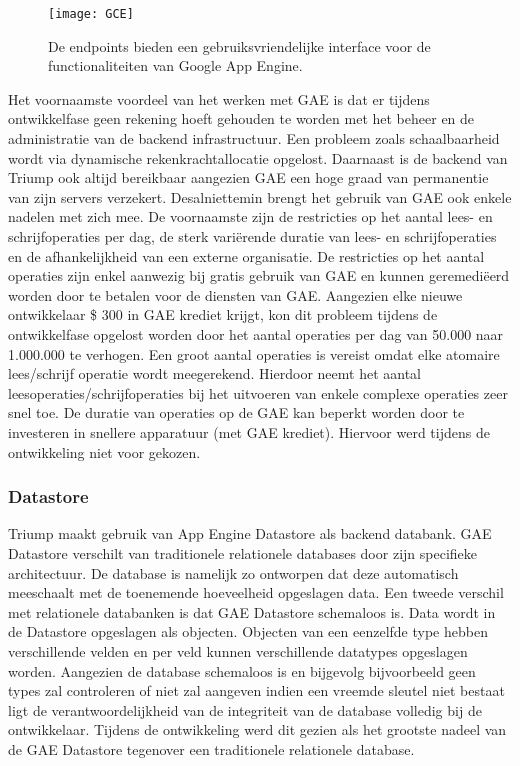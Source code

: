 \begin{figure}[H]
	\centering
	\texttt{[image: GCE]}
	\caption{De endpoints  bieden een gebruiksvriendelijke interface voor de functionaliteiten van Google App Engine.}
	\label{fig:Overzicht Google Cloud Endpoints}
\end{figure}

Het voornaamste voordeel van het werken met GAE is dat er tijdens ontwikkelfase geen rekening hoeft gehouden te worden met het  beheer en de administratie van de backend infrastructuur. Een probleem zoals schaalbaarheid wordt via dynamische rekenkrachtallocatie opgelost. Daarnaast is de backend van Triump ook altijd bereikbaar aangezien GAE een hoge graad van permanentie van zijn servers verzekert. Desalniettemin brengt het gebruik van GAE ook enkele nadelen met zich mee. De voornaamste zijn de restricties op het aantal lees- en schrijfoperaties per dag, de sterk variërende duratie van lees- en schrijfoperaties en de afhankelijkheid van een externe organisatie. De restricties op het aantal operaties zijn enkel aanwezig bij gratis gebruik van GAE en kunnen geremediëerd worden door te betalen voor de diensten van GAE.
Aangezien elke nieuwe ontwikkelaar \$ 300 in GAE krediet krijgt, kon dit probleem tijdens de ontwikkelfase opgelost worden door het aantal operaties per dag van 50.000 naar 1.000.000 te verhogen. Een groot aantal operaties is vereist omdat elke atomaire lees/schrijf operatie wordt meegerekend. Hierdoor neemt het aantal leesoperaties/schrijfoperaties bij het uitvoeren van enkele complexe operaties zeer snel toe. De duratie van operaties op de GAE kan beperkt worden door te investeren in snellere apparatuur (met GAE krediet). Hiervoor werd tijdens de ontwikkeling niet voor gekozen.

\subsubsection{Datastore~\cite{Google_Datastore}}

Triump maakt gebruik van App Engine Datastore als backend databank. GAE Datastore verschilt van traditionele relationele databases door zijn specifieke architectuur. De database is namelijk zo ontworpen dat deze automatisch meeschaalt met de toenemende hoeveelheid opgeslagen data. Een tweede verschil met relationele databanken is dat GAE Datastore schemaloos is. Data wordt in de Datastore opgeslagen als objecten. Objecten van een eenzelfde type hebben verschillende velden en per veld kunnen verschillende datatypes opgeslagen worden.
Aangezien de database schemaloos is en bijgevolg bijvoorbeeld geen types zal controleren of niet zal aangeven indien een vreemde sleutel niet bestaat ligt de verantwoordelijkheid van de integriteit van de database volledig bij de ontwikkelaar. Tijdens de ontwikkeling werd dit gezien als het grootste nadeel van de GAE Datastore tegenover een traditionele relationele database.

